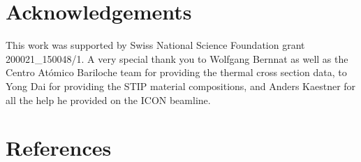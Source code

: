 \documentclass[5p,12pt]{elsarticle}
\begin{document}
%
%
%
%
%

\section*{Acknowledgements}
\label{sec:ack}

This work was supported by Swiss National Science Foundation grant 200021\_150048/1.  A very special thank you to Wolfgang Bernnat as well as the Centro At\'{o}mico Bariloche team for providing the thermal cross section data, to Yong Dai for providing the STIP material compositions, and Anders Kaestner for all the help he provided on the ICON beamline.

%
%
%
%
%

\section*{References}


\end{document}
